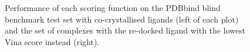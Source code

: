 \begin{figure}
\centering
{}
\caption{Performance of each scoring function on the PDBbind blind benchmark test set with co-crystallised ligands (left of each plot) and the set of complexes with the re-docked ligand with the lowest Vina score instead (right).}
\label{rfscore4:set-2-pdbbind-2012-trn-1}
\end{figure}

